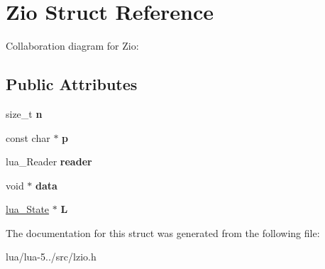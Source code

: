 \hypertarget{struct_zio}{\section{Zio Struct Reference}
\label{struct_zio}
}


Collaboration diagram for Zio\+:
\subsection*{Public Attributes}
\begin{DoxyCompactItemize}
\item 
\hypertarget{struct_zio_a7e086aa8f8c620f46c4697dc14c186ce}{size\+\_\+t {\bfseries n}}\label{struct_zio_a7e086aa8f8c620f46c4697dc14c186ce}

\item 
\hypertarget{struct_zio_a14ac73a363603164c07329d14063221b}{const char $\ast$ {\bfseries p}}\label{struct_zio_a14ac73a363603164c07329d14063221b}

\item 
\hypertarget{struct_zio_a543c6a2239f478a708e4549ee4453b56}{lua\+\_\+\+Reader {\bfseries reader}}\label{struct_zio_a543c6a2239f478a708e4549ee4453b56}

\item 
\hypertarget{struct_zio_a78d84c6b39ee04b43be6638f2887915d}{void $\ast$ {\bfseries data}}\label{struct_zio_a78d84c6b39ee04b43be6638f2887915d}

\item 
\hypertarget{struct_zio_a605b7ca7868887491196af34d9b7d765}{\hyperlink{structlua___state}{lua\+\_\+\+State} $\ast$ {\bfseries L}}\label{struct_zio_a605b7ca7868887491196af34d9b7d765}

\end{DoxyCompactItemize}


The documentation for this struct was generated from the following file\+:\begin{DoxyCompactItemize}
\item 
lua/lua-\/5../src/lzio.\+h\end{DoxyCompactItemize}
